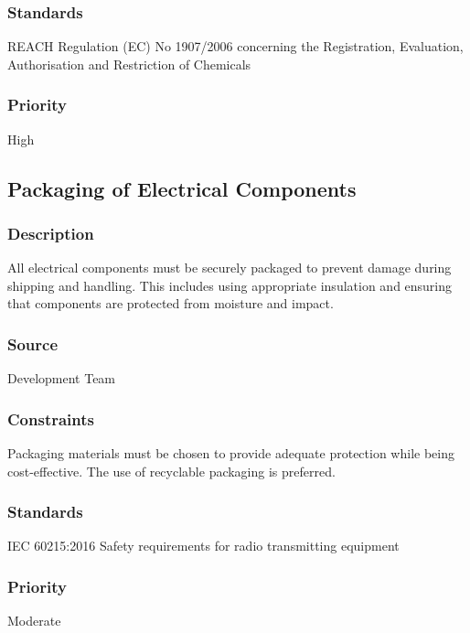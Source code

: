 \subsubsection{Standards}
REACH Regulation (EC) No 1907/2006 concerning the Registration, Evaluation, Authorisation and Restriction of Chemicals
\subsubsection{Priority}
High

\subsection{Packaging of Electrical Components}
\subsubsection{Description}
All electrical components must be securely packaged to prevent damage during shipping and handling. This includes using appropriate insulation and ensuring that components are protected from moisture and impact.
\subsubsection{Source}
Development Team
\subsubsection{Constraints}
Packaging materials must be chosen to provide adequate protection while being cost-effective. The use of recyclable packaging is preferred.
\subsubsection{Standards}
IEC 60215:2016 Safety requirements for radio transmitting equipment
\subsubsection{Priority}
Moderate
